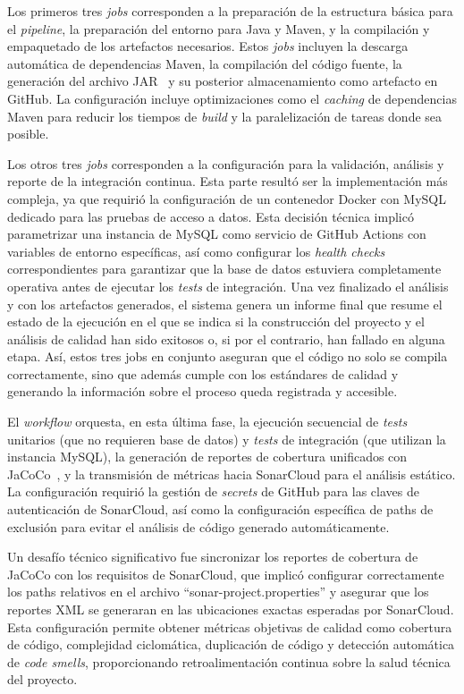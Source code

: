 Los primeros tres \emph{jobs} corresponden a la preparación de la estructura básica para el \emph{pipeline}, la preparación del entorno para Java y Maven, y la compilación y empaquetado de los artefactos necesarios. Estos \emph{jobs} incluyen la descarga automática de dependencias Maven, la compilación del código fuente, la generación del archivo JAR~\cite{jar} y su posterior almacenamiento como artefacto en GitHub. La configuración incluye optimizaciones como el \emph{caching} de dependencias Maven para reducir los tiempos de \emph{build} y la paralelización de tareas donde sea posible.

Los otros tres \emph{jobs} corresponden a la configuración para la validación, análisis y reporte de la integración continua. Esta parte resultó ser la implementación más compleja, ya que requirió la configuración de un contenedor Docker con MySQL dedicado para las pruebas de acceso a datos. Esta decisión técnica implicó parametrizar una instancia de MySQL como servicio de GitHub Actions con variables de entorno específicas, así como configurar los \emph{health checks} correspondientes para garantizar que la base de datos estuviera completamente operativa antes de ejecutar los \emph{tests} de integración. Una vez finalizado el análisis y con los artefactos generados, el sistema genera un informe final que resume el estado de la ejecución en el que se indica si la construcción del proyecto y el análisis de calidad han sido exitosos o, si por el contrario, han fallado en alguna etapa. Así, estos tres jobs en conjunto aseguran que el código no solo se compila correctamente, sino que además cumple con los estándares de calidad y generando la información sobre el proceso queda registrada y accesible.

El \emph{workflow} orquesta, en esta última fase, la ejecución secuencial de \emph{tests} unitarios (que no requieren base de datos) y \emph{tests} de integración (que utilizan la instancia MySQL), la generación de reportes de cobertura unificados con JaCoCo~\cite{jacoco}, y la transmisión de métricas hacia SonarCloud para el análisis estático. La configuración requirió la gestión de \emph{secrets} de GitHub para las claves de autenticación de SonarCloud, así como la configuración específica de paths de exclusión para evitar el análisis de código generado automáticamente.

Un desafío técnico significativo fue sincronizar los reportes de cobertura de JaCoCo con los requisitos de SonarCloud, que implicó configurar correctamente los paths relativos en el archivo ``sonar-project.properties'' y asegurar que los reportes XML se generaran en las ubicaciones exactas esperadas por SonarCloud. Esta configuración permite obtener métricas objetivas de calidad como cobertura de código, complejidad ciclomática, duplicación de código y detección automática de \emph{code smells}, proporcionando retroalimentación continua sobre la salud técnica del proyecto.
